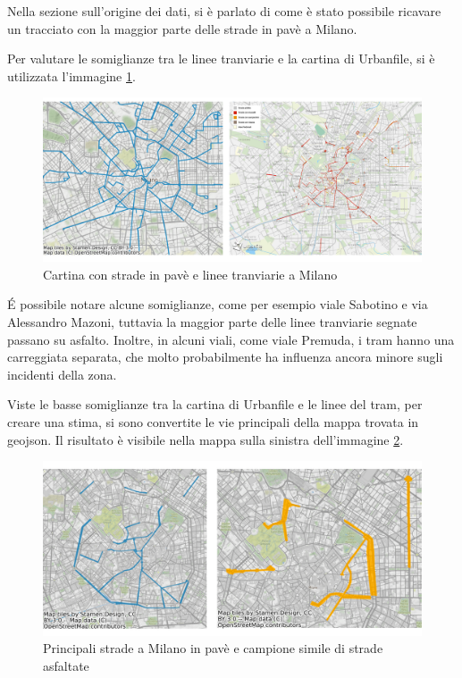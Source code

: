 \documentclass[a4paper,12pt]{report}
\begin{document}
Nella sezione sull'origine dei dati, si è parlato di come è stato possibile ricavare 
un tracciato con la maggior parte delle strade in pavè a Milano.

Per valutare le somiglianze tra le linee tranviarie e la cartina di 
Urbanfile, si è utilizzata l'immagine \ref{fig:tram-pave-milano}.

\begin{figure}
    \includegraphics[width=\linewidth]{../src/tram/tram_milano.png}
    \caption{Cartina con strade in pavè e linee tranviarie a Milano}
    \label{fig:tram-pave-milano}
\end{figure}

\'E possibile notare alcune somiglianze, come per esempio viale Sabotino e via 
Alessandro Mazoni, tuttavia la maggior parte delle linee tranviarie segnate 
passano su asfalto.
Inoltre, in alcuni viali, come viale Premuda, i tram hanno una carreggiata separata, 
che molto probabilmente ha influenza ancora minore sugli incidenti della zona.

Viste le basse somiglianze tra la cartina di Urbanfile e le linee del tram, 
per creare una stima, si sono convertite le vie principali della mappa trovata 
in geojson. 
Il risultato è visibile nella mappa sulla sinistra dell'immagine \ref{fig:mappa-pave}.

\begin{figure}
    \includegraphics[width=\linewidth]{img_unite/mappa_pave_asfalto.png}
    \caption{Principali strade a Milano in pavè e campione simile di strade asfaltate}
    \label{fig:mappa-pave}
\end{figure}
\end{document}
